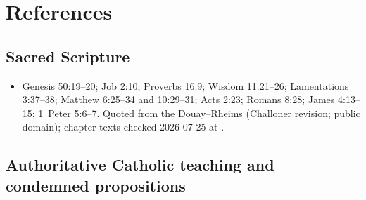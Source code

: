 \section{References}

\begingroup
\setlength{\parskip}{0pt}
\titlespacing*{\subsection}{0pt}{1.0ex}{0.3ex}

\subsection*{Sacred Scripture}

{\fontsize{8.6}{9.6}\selectfont
\begin{itemize}[itemsep=0pt,parsep=0pt,topsep=0.05em]
\item Genesis 50:19--20; Job 2:10; Proverbs 16:9; Wisdom 11:21--26; Lamentations 3:37--38; Matthew 6:25--34 and 10:29--31; Acts 2:23; Romans 8:28; James 4:13--15; 1~Peter 5:6--7. Quoted from the Douay--Rheims (Challoner revision; public domain); chapter texts checked 2026-07-25 at .
\end{itemize}}

\subsection*{Authoritative Catholic teaching and condemned propositions}


